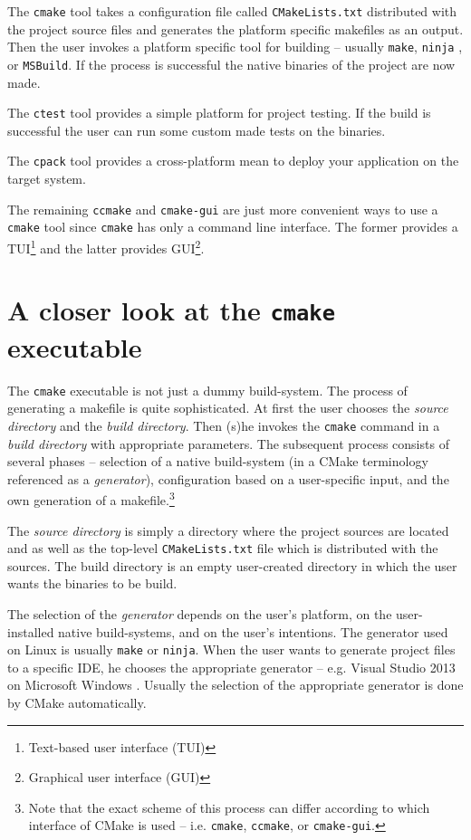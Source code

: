\documentclass[12pt,oneside]{fithesis2}
\begin{document}
The \texttt{cmake} tool takes a configuration file called \texttt{CMakeLists.txt} distributed with the project source files and generates the platform specific makefiles as an output. Then the user invokes a platform specific tool for building -- usually \texttt{make}, \texttt{ninja} \cite{ninja}, or \texttt{MSBuild}. \cite{msbuild} If the process is successful the native binaries of the project are now made.

The \texttt{ctest} tool provides a simple platform for project testing. If the build is successful the user can run some custom made tests on the binaries.

The \texttt{cpack} tool provides a cross-platform mean to deploy your application on the target system.

The remaining \texttt{ccmake} and \texttt{cmake-gui} are just more convenient ways to use a \texttt{cmake} tool since \texttt{cmake} has only a command line interface. The former provides a TUI\footnote{Text-based user interface (TUI)} and the latter provides GUI\footnote{Graphical user interface (GUI)}.

\section{A closer look at the \texttt{cmake} executable}

The \texttt{cmake} executable is not just a dummy build-system. The process of generating a makefile is quite sophisticated. At first the user chooses the \emph{source directory} and the \emph{build directory}. Then (s)he invokes the \texttt{cmake} command in a \emph{build directory} with appropriate parameters. The subsequent process consists of several phases -- selection of a native build-system (in a CMake terminology referenced as a \emph{generator}), configuration based on a user-specific input, and the own generation of a makefile.\footnote{Note that the exact scheme of this process can differ according to which interface of CMake is used -- i.e. \texttt{cmake}, \texttt{ccmake}, or \texttt{cmake-gui}.}

The \emph{source directory} is simply a directory where the project sources are located and as well as the top-level \texttt{CMakeLists.txt} file which is distributed with the sources. The build directory is an empty user-created directory in which the user wants the binaries to be build.

The selection of the \emph{generator} depends on the user's platform, on the user-installed native build-systems, and on the user's intentions. The generator used on Linux is usually \texttt{make} or \texttt{ninja}. When the user wants to generate project files to a specific IDE, he chooses the appropriate generator -- e.g. Visual Studio 2013 \cite{msvc} on Microsoft Windows \cite{win}. Usually the selection of the appropriate generator is done by CMake automatically.
\end{document}
